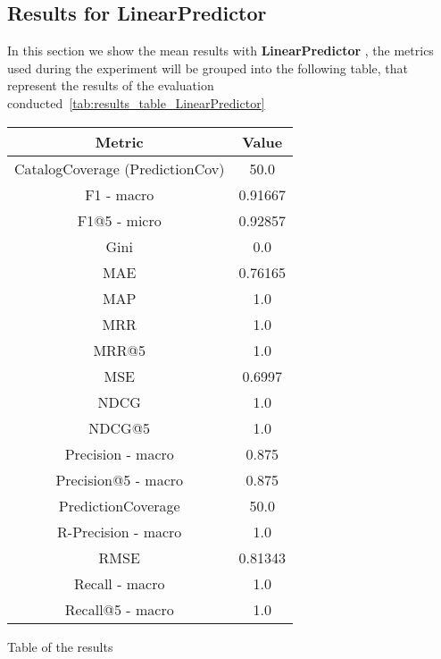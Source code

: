 \documentclass[11pt]{article}
\begin{document}
\hfill\break
\hfill\break



\subsection{Results for LinearPredictor}\label{subsec:LinearPredictor}
In this section we show the mean results with \textbf{ LinearPredictor }, the metrics used during the experiment will be
grouped into the following table, that represent the results of the evaluation conducted~\ref{tab:results_table_LinearPredictor}

\begin{center}
    \begin{tabular}{|c|c|}
        \hline
        \textbf{Metric} & \textbf{Value} \\ \hline
                CatalogCoverage (PredictionCov) & 50.0 \\ \hline
                F1 - macro & 0.91667 \\ \hline
                F1@5 - micro & 0.92857 \\ \hline
                Gini & 0.0 \\ \hline
                MAE & 0.76165 \\ \hline
                MAP & 1.0 \\ \hline
                MRR & 1.0 \\ \hline
                MRR@5 & 1.0 \\ \hline
                MSE & 0.6997 \\ \hline
                NDCG & 1.0 \\ \hline
                NDCG@5 & 1.0 \\ \hline
                Precision - macro & 0.875 \\ \hline
                Precision@5 - macro & 0.875 \\ \hline
                PredictionCoverage & 50.0 \\ \hline
                R-Precision - macro & 1.0 \\ \hline
                RMSE & 0.81343 \\ \hline
                Recall - macro & 1.0 \\ \hline
                Recall@5 - macro & 1.0 \\ \hline
             \end{tabular}
    \captionsetup{type=table}
    \caption{Table of the results}
    \label{tab:results_table_LinearPredictor}
\end{center}
\hfill\break
\hfill\break
\end{document}
